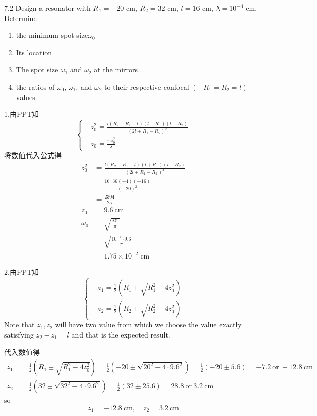 7.2
Design a resonator with $R_1=-20$ cm, $R_2=32$ cm, $l=16$ cm, $\lambda=10^{-4}$ cm.
Determine
\begin{enumerate}
    \item the minimum spot size$\omega_0$
    \item Its location
    \item The spot size $\omega_1$ and $\omega_2$ at the mirrors
    \item the ratios of $\omega_0$, $\omega_1$, and $\omega_2$ to their respective confocal $(-R_1 = R_2 = l)$ values.
\end{enumerate}

1.由PPT知
$$
\left\{
\begin{aligned}
    &z_0^2=\frac{l(R_2-R_1-l)(l+R_1)(l-R_2)}{(2l+R_1-R_2)^2}\\
    &z_0=\frac{\pi \omega_0^2}{\lambda}
\end{aligned}
\right.
$$
将数值代入公式得
\begin{align*}
    z_0^2
    &=\frac{l(R_2-R_1-l)(l+R_1)(l-R_2)}{(2l+R_1-R_2)^2}\\
    &=\frac{16\cdot36(-4)(-16)}{(-20)^2}\\
    &=\frac{2304}{25}\\
    z_0
    &=9.6 \ \mathrm{cm}\\
    \omega_0
    &=\sqrt{\frac{\lambda z_0}{\pi}}\\
    &=\sqrt{\frac{10^{-4} \cdot 9.6}{\pi}}\\
    &=1.75\times10^{-2} \ \mathrm{cm}
\end{align*}

2.由PPT知
$$
\left\{
\begin{aligned}
    &z_1=\frac{1}{2}\left(R_1\pm \sqrt{R_1^2-4z_0^2}\right)\\
    &z_2=\frac{1}{2}\left(R_2\pm \sqrt{R_2^2-4z_0^2}\right)
\end{aligned}
\right.
$$
Note that $z_1, z_2$ will have two value from which we choose the value exactly satisfying $z_2-z_1=l$ and that is the expected result.

代入数值得
\begin{align*}
    z_1
    &=\frac{1}{2}\left(R_1\pm \sqrt{R_1^2-4z_0^2}\right)
    =\frac{1}{2}\left(-20\pm \sqrt{20^2-4\cdot 9.6^2}\right)
    =\frac{1}{2}\left(-20\pm 5.6\right)
    =-7.2 \ \mathrm{or}\  -12.8 \ \mathrm{cm}\\
    z_2
    &=\frac{1}{2}\left(32\pm \sqrt{32^2-4\cdot 9.6^2}\right)
    =\frac{1}{2}\left(32\pm 25.6\right)
    =28.8 \ \mathrm{or}\ 3.2 \ \mathrm{cm}
\end{align*}
so 
$$
z_1=-12.8 \ \mathrm{cm}, \quad z_2=3.2 \ \mathrm{cm}
$$



